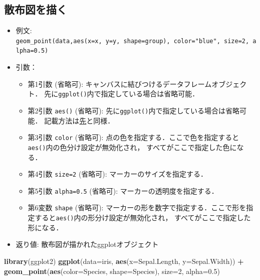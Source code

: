 \documentclass[
  xelatex, ja=standard]{bxjsarticle}
\newenvironment{Shaded}{\begin{snugshade}}{\end{snugshade}}
\newcommand{\AttributeTok}[1]{\textcolor[rgb]{0.13,0.29,0.53}{#1}}
\newcommand{\DecValTok}[1]{\textcolor[rgb]{0.00,0.00,0.81}{#1}}
\newcommand{\FloatTok}[1]{\textcolor[rgb]{0.00,0.00,0.81}{#1}}
\newcommand{\FunctionTok}[1]{\textcolor[rgb]{0.13,0.29,0.53}{\textbf{#1}}}
\newcommand{\NormalTok}[1]{#1}
\newcommand{\SpecialCharTok}[1]{\textcolor[rgb]{0.81,0.36,0.00}{\textbf{#1}}}
\providecommand{\tightlist}{%
  \setlength{\itemsep}{0pt}\setlength{\parskip}{0pt}}
\begin{document}
\subsection{散布図を描く}\label{ux6563ux5e03ux56f3ux3092ux63cfux304f}

\begin{itemize}
\tightlist
\item
  例文:
  \texttt{geom\_point(data,aes(x=x,\ y=y,\ shape=group),\ color="blue",\ size=2,\ alpha=0.5)}
\item
  引数：

  \begin{itemize}
  \tightlist
  \item
    第1引数 (省略可): キャンバスに結びつけるデータフレームオブジェクト．
    先に\texttt{ggplot()}内で指定している場合は省略可能．
  \item
    第2引数 \texttt{aes()} (省略可):
    先に\texttt{ggplot()}内で指定している場合は省略可能．
    記載方法は\hyperref[ux30adux30e3ux30f3ux30d0ux30b9ux306eux4f5cux6210]{先}と同様．
  \item
    第3引数 \texttt{color} (省略可):
    点の色を指定する．ここで色を指定すると\texttt{aes()}内の色分け設定が無効化され，
    すべてがここで指定した色になる．
  \item
    第4引数 \texttt{size=2} (省略可): マーカーのサイズを指定する．
  \item
    第5引数 \texttt{alpha=0.5} (省略可): マーカーの透明度を指定する．
  \item
    第6変数 \texttt{shape} (省略可):
    マーカーの形を数字で指定する．ここで形を指定すると\texttt{aes()}内の形分け設定が無効化され，
    すべてがここで指定した形になる．
  \end{itemize}
\item
  返り値: 散布図が描かれたggplotオブジェクト
\end{itemize}

\begin{Shaded}
\begin{Highlighting}[]
\FunctionTok{library}\NormalTok{(ggplot2)}
\FunctionTok{ggplot}\NormalTok{(}\AttributeTok{data=}\NormalTok{iris, }\FunctionTok{aes}\NormalTok{(}\AttributeTok{x=}\NormalTok{Sepal.Length, }\AttributeTok{y=}\NormalTok{Sepal.Width)) }\SpecialCharTok{+}
  \FunctionTok{geom\_point}\NormalTok{(}\FunctionTok{aes}\NormalTok{(}\AttributeTok{color=}\NormalTok{Species, }\AttributeTok{shape=}\NormalTok{Species), }\AttributeTok{size=}\DecValTok{2}\NormalTok{, }\AttributeTok{alpha=}\FloatTok{0.5}\NormalTok{)}
\end{Highlighting}
\end{Shaded}
\end{document}
